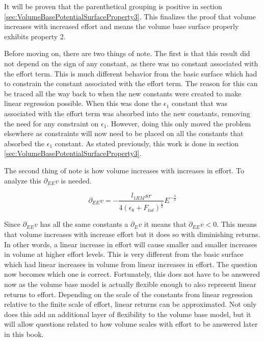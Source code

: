 It will be proven that the parenthetical grouping is positive in section \ref{sec:VolumeBasePotentialSurfaceProperty3}. This finalizes the proof that volume increases with increased effort and means the volume base surface properly exhibits property 2.

Before moving on, there are two things of note. The first is that this result did not depend on the sign of any constant, as there was no constant associated with the effort term. This is much different behavior from the basic surface which had to constrain the constant associated with the effort term. The reason for this can be traced all the way back to when the new constants were created to make linear regression possible. When this was done the $\epsilon_1$ constant that was associated with the effort term was absorbed into the new constants, removing the need for any constraint on $\epsilon_1$. However, doing this only moved the problem elsewhere as constraints will now need to be placed on all the constants that absorbed the $\epsilon_1$ constant. As stated previously, this work is done in section \ref{sec:VolumeBasePotentialSurfaceProperty3}.

The second thing of note is how volume increases with increases in effort. To analyze this $\partial_{EE} v$ is needed.

\begin{equation*}
	\partial_{EE}v=-\frac{
    			l_{1RM} sr
    		}{
    			4 \left(\epsilon_8+F_{tot} \right)^{\frac{1}{2}}
    		} E^{-\frac{3}{2}}
\end{equation*}

Since $\partial_{EE}v$ has all the same constants a $\partial_Ev$ it means that $\partial_{EE}v<0$. This means that volume increases with increase effort but it does so with diminishing returns. In other words, a linear increase in effort will cause smaller and smaller increases in volume at higher effort levels. This is very different from the basic surface which had linear increases in volume from linear increases in effort. The question now becomes which one is correct. Fortunately, this does not have to be answered now as the volume base model is actually flexible enough to also represent linear returns to effort. Depending on the scale of the constants from linear regression relative to the finite scale of effort, linear returns can be approximated. Not only does this add an additional layer of flexibility to the volume base model, but it will allow questions related to how volume scales with effort to be answered later in this book.

